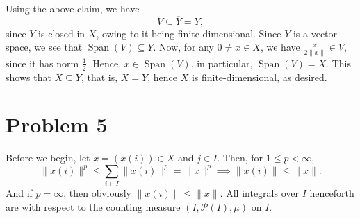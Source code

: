 \documentclass[10pt]{amsart}
\theoremstyle{thmstyle}
\newtheorem{lemma}[theorem]{Lemma}
\theoremstyle{defstyle}
\newcommand{\scrP}{\mathscr P}
\newcommand{\Span}{\operatorname{Span}}
\renewcommand{\le}{\leqslant}
\renewcommand{\ge}{\geqslant}
\begin{document}
Using the above claim, we have 
\begin{equation*}
	V\subseteq\overline Y = Y,
\end{equation*}
since $Y$ is closed in $X$, owing to it being finite-dimensional. Since $Y$ is a vector space, we see that $\Span(V)\subseteq Y$. Now, for any $0\ne x\in X$, we have $\frac{x}{2\|x\|}\in V$, since it has norm $\frac{1}{2}$. Hence, $x\in\Span(V)$, in particular, $\Span(V) = X$. This shows that $X\subseteq Y$, that is, $X = Y$, hence $X$ is finite-dimensional, as desired.


\section{Problem 5}


Before we begin, let $x = (x(i))\in X$ and $j\in I$. Then, for $1\le p < \infty$, 
\begin{equation*}
	\|x(i)\|^p\le\sum_{i\in I}\|x(i)\|^p = \|x\|^p\implies\|x(i)\|\le \|x\|.
\end{equation*}
And if $p = \infty$, then obviously $\|x(i)\|\le \|x\|$. All integrals over $I$ henceforth are with respect to the counting measure $(I, \scrP(I), \mu)$ on $I$.
\end{document}
